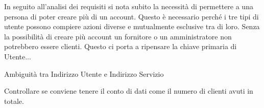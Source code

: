 In seguito all'analisi dei requisiti si nota subito la necessità di permettere a una persona di poter creare più di un account. Questo è necessario perché i tre tipi di utente possono compiere azioni diverse e mutualmente esclusive tra di loro. Senza la possibilità di creare più account un fornitore o un amministratore non potrebbero essere clienti. Questo ci porta a ripensare la chiave primaria di Utente...%

Ambiguità tra Indirizzo Utente e Indirizzo Servizio


Controllare se conviene tenere il conto di dati come il numero di clienti avuti in totale. %